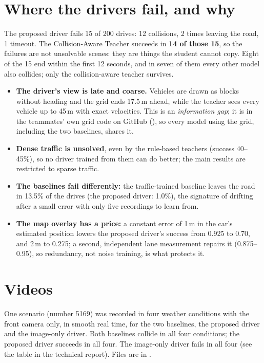 \section{Where the drivers fail, and why}

\begin{plainwords}
The proposed driver fails 15 of 200 drives: 12 collisions, 2 times leaving the road, 1 timeout. The Collision-Aware Teacher succeeds in \textbf{14 of those 15}, so the failures are not unsolvable scenes: they are things the student cannot copy. Eight of the 15 end within the first 12 seconds, and in seven of them every other model also collides; only the collision-aware teacher survives.
\end{plainwords}

\begin{itemize}
\item \textbf{The driver's view is late and coarse.} Vehicles are drawn as blocks without heading and the grid ends 17.5\,m ahead, while the teacher sees every vehicle up to 45\,m with exact velocities. This is an \emph{information gap}; it is in the teammates' own grid code on GitHub (), so every model using the grid, including the two baselines, shares it.
\item \textbf{Dense traffic is unsolved}, even by the rule-based teachers (success 40--45\%), so no driver trained from them can do better; the main results are restricted to sparse traffic.
\item \textbf{The baselines fail differently:} the traffic-trained baseline leaves the road in 13.5\% of the drives (the proposed driver: 1.0\%), the signature of drifting after a small error with only five recordings to learn from.
\item \textbf{The map overlay has a price:} a constant error of 1\,m in the car's estimated position lowers the proposed driver's success from 0.925 to 0.70, and 2\,m to 0.275; a second, independent lane measurement repairs it (0.875--0.95), so redundancy, not noise training, is what protects it.
\end{itemize}

\section{Videos}
\begin{plainwords}
One scenario (number 5169) was recorded in four weather conditions with the front camera only, in smooth real time, for the two baselines, the proposed driver and the image-only driver. Both baselines collide in all four conditions; the proposed driver succeeds in all four. The image-only driver fails in all four (see the table in the technical report). Files are in .
\end{plainwords}


